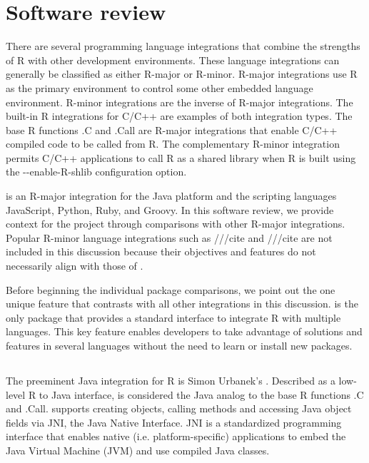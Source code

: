 \section{Software review}

There are several programming language integrations that combine the strengths of R with other development environments. These language integrations can generally be classified as either R-major or R-minor. R-major integrations use R as the primary environment to control some other embedded language environment. R-minor integrations are the inverse of R-major integrations. The built-in R integrations for C/C++ are examples of both integration types. The base R functions .C and .Call are R-major integrations that enable C/C++ compiled code to be called from R. The complementary R-minor integration permits C/C++ applications to call R as a shared library when R is built using the -{}-enable-R-shlib configuration option.

 is an R-major integration for the Java platform and the scripting languages JavaScript, Python, Ruby, and Groovy. In this software review, we provide context for the  project through comparisons with other R-major integrations. Popular R-minor language integrations such as  ///cite and  ///cite are not included in this discussion because their objectives and features do not necessarily align with those of .

Before beginning the individual package comparisons, we point out the one unique feature that contrasts  with all other integrations in this discussion.  is the only package that provides a standard interface to integrate R with multiple languages. This key feature enables developers to take advantage of solutions and features in several languages without the need to learn or install new packages.

\subsection{}

The preeminent Java integration for R is Simon Urbanek's . Described as a low-level R to Java interface,  is considered the Java analog to the base R functions .C and .Call.  supports creating objects, calling methods and accessing Java object fields via JNI, the Java Native Interface. JNI is a standardized programming interface that enables native (i.e. platform-specific) applications to embed the Java Virtual Machine (JVM) and use compiled Java classes.

